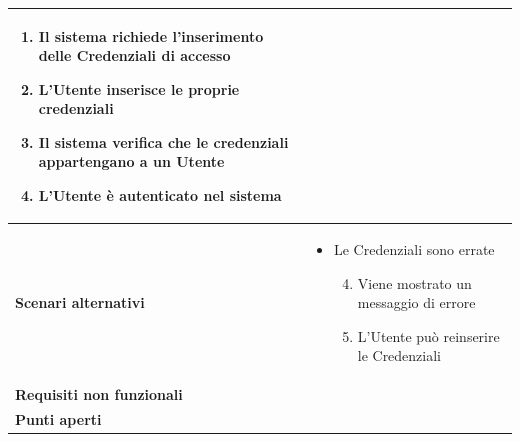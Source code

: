 \documentclass[12pt,a4paper]{report}
\let\oldhyperref\hyperref
\renewcommand{\hyperref}[2][]{\oldhyperref[#1]{\dotuline{#2}}}
\begin{document}
\begin{tabularx}{\textwidth}{|p{3.8cm}|X|}
\begin{enumerate}[nosep, leftmargin=*, before={\vspace{-0.5\baselineskip}}, after={\vspace{-0.8\baselineskip}}]
            \item Il sistema richiede l'inserimento delle Credenziali di accesso
            \item L'Utente inserisce le proprie credenziali
            \item Il sistema verifica che le credenziali appartengano a un Utente
            \item L'Utente è autenticato nel sistema
        \end{enumerate} \\ \hline
    \textbf{Scenari alternativi} & 
        \begin{itemize}[nosep, leftmargin=*, before={\vspace{-0.5\baselineskip}}, after={\vspace{-0.8\baselineskip}}]
            \item Le Credenziali sono errate
            \begin{enumerate}[nosep, leftmargin=*]
                \setcounter{enumi}{3}
                \item Viene mostrato un messaggio di errore
                \item L'Utente può reinserire le Credenziali
            \end{enumerate}
        \end{itemize} \\ \hline
    \textbf{Requisiti non funzionali} & \hyperref[R02N]{R02N} \\ \hline
    \textbf{Punti aperti} & \\ \hline
\end{tabularx}

\newpage
\end{document}
